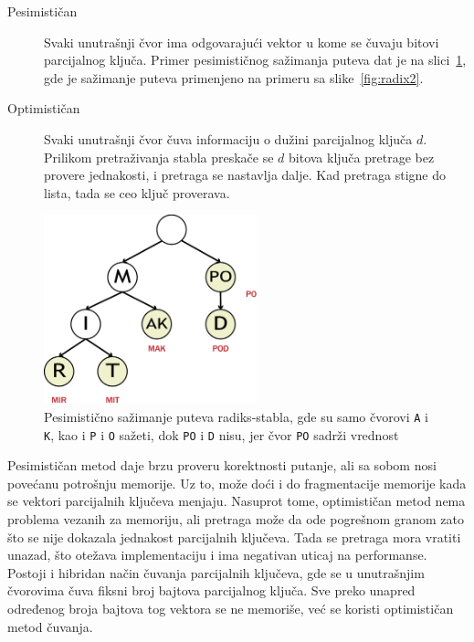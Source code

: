 \documentclass[12pt,oneside]{memoir}
\begin{document}
\begin{description}
  \item[Pesimističan] Svaki unutrašnji čvor ima odgovarajući vektor
        u kome se čuvaju bitovi parcijalnog ključa. Primer pesimističnog
        sažimanja puteva dat je na slici~\ref{fig:radix_compression},
        gde je sažimanje puteva primenjeno na primeru sa
        slike~\ref{fig:radix2}.
  \item[Optimističan] Svaki unutrašnji čvor čuva informaciju o dužini
        parcijalnog ključa $d$. Prilikom pretraživanja stabla preskače se
        $d$ bitova ključa pretrage bez provere jednakosti,
        i pretraga se nastavlja dalje.
        Kad pretraga stigne do lista, tada se ceo ključ proverava.
\end{description}


\begin{figure}[!h]
  \centering
  \includegraphics[width=0.55\textwidth]{radix_compression.eps}
  \caption{Pesimistično sažimanje puteva radiks-stabla, gde su samo
    čvorovi \texttt{A} i \texttt{K}, kao i \texttt{P} i \texttt{O} sažeti,
    dok \texttt{PO} i \texttt{D} nisu, jer čvor \texttt{PO}
    sadrži vrednost}
  \label{fig:radix_compression}
\end{figure}

Pesimističan metod daje brzu proveru korektnosti putanje, ali sa sobom nosi
povećanu potrošnju memorije. Uz to, može doći i do fragmentacije
memorije kada se vektori parcijalnih ključeva menjaju.
Nasuprot tome, optimističan metod nema
problema vezanih za memoriju, ali pretraga može da ode pogrešnom granom zato što se
nije dokazala jednakost parcijalnih ključeva. Tada se
pretraga mora vratiti unazad, što otežava implementaciju i ima negativan
uticaj na performanse. Postoji i hibridan način čuvanja parcijalnih ključeva,
gde se u unutrašnjim čvorovima čuva fiksni broj bajtova parcijalnog ključa.
Sve preko unapred određenog broja bajtova tog vektora se ne memoriše,
već se koristi optimističan metod čuvanja.
\end{document}
